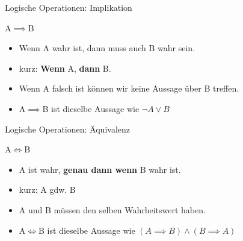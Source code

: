 \begin{frame}{Logische Operationen: Implikation}
\begin{alertblock}{A$\implies$B}
\begin{itemize}
    \item \glqq Wenn A wahr ist, dann muss auch B wahr sein.\grqq
    \item kurz: \glqq\textbf{Wenn} A, \textbf{dann} B.\grqq
    \item Wenn A falsch ist können wir keine Aussage über B treffen.
    \item A$\implies$B ist dieselbe Aussage wie $\neg A \vee B$
\end{itemize}
\end{alertblock}
\end{frame}

\begin{frame}{Logische Operationen: Äquivalenz}
\begin{alertblock}{A$\iff$B}
\begin{itemize}
    \item \glqq A ist wahr, \textbf{genau dann wenn} B wahr ist.\grqq
    \item kurz: \glqq A gdw. B\grqq
    \item A und B müssen den selben Wahrheitswert haben.
    \item A$\iff$B ist dieselbe Aussage wie $(A \implies B) \wedge (B \implies A)$
\end{itemize}
\end{alertblock}
\end{frame}

